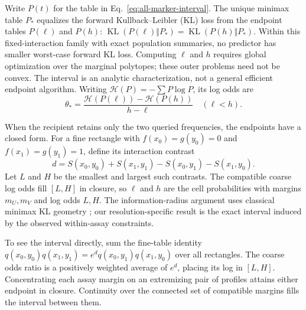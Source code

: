 \documentclass[pdflatex,sn-vancouver-num,iicol]{sn-jnl}
\newcommand{\KL}{\operatorname{KL}}
\begin{document}
Write $P(t)$ for the table in Eq.~\eqref{eq:all-marker-interval}. The unique
minimax table $P_*$ equalizes the forward Kullback--Leibler (KL)
loss from the endpoint tables $P(\ell)$ and $P(h)$:
$\KL(P(\ell)\Vert P_*)=\KL(P(h)\Vert P_*)$. Within this fixed-interaction
family with exact population summaries, no predictor has smaller worst-case forward
KL loss. Computing
$\ell$ and $h$ requires global optimization over the marginal polytopes;
these outer problems need not be convex. The interval is an analytic
characterization, not a general efficient endpoint algorithm.
\ifdefined\ReaderVersion{}\fi
Writing $\mathcal H(P)=-\sum P\log P$, its log odds are
\begin{equation}
 \theta_*=\frac{\mathcal H(P(\ell))-\mathcal H(P(h))}{h-\ell}
 \quad(\ell<h).
 \label{eq:minimax}
\end{equation}

When the recipient retains only the two queried frequencies, the endpoints
have a closed form. For a fine rectangle with
$f(x_0)=g(y_0)=0$ and $f(x_1)=g(y_1)=1$, define its interaction contrast
\begin{equation}
 d=S(x_0,y_0)+S(x_1,y_1)-S(x_0,y_1)-S(x_1,y_0).
 \label{eq:contrast}
\end{equation}
Let $L$ and $H$ be the smallest and largest such contrasts. The compatible
coarse log odds fill $[L,H]$ in closure, so $\ell$ and $h$ are the cell
probabilities with margins $m_U,m_V$ and log odds $L,H$. The information-radius
argument uses classical minimax KL geometry \cite{vanerven}; our
resolution-specific result is the exact interval induced by the observed
within-assay constraints.

To see the interval directly, sum the fine-table identity
$q(x_0,y_0)q(x_1,y_1)=e^d q(x_0,y_1)q(x_1,y_0)$ over all rectangles.
The coarse odds ratio is a positively weighted average of $e^d$, placing its
log in $[L,H]$. Concentrating each assay margin on an extremizing pair of
profiles attains either endpoint in closure. Continuity over the connected
set of compatible margins fills the interval between them.
\end{document}
